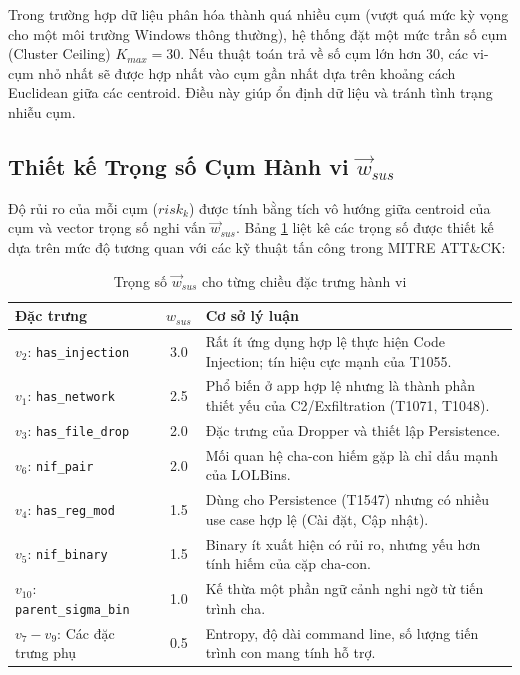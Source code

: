 \documentclass[../main.tex]{subfiles}
\begin{document}
Trong trường hợp dữ liệu phân hóa thành quá nhiều cụm (vượt quá mức kỳ vọng cho một môi trường Windows thông thường), hệ thống đặt một mức trần số cụm (Cluster Ceiling) $K_{max} = 30$. Nếu thuật toán trả về số cụm lớn hơn 30, các vi-cụm nhỏ nhất sẽ được hợp nhất vào cụm gần nhất dựa trên khoảng cách Euclidean giữa các centroid. Điều này giúp ổn định dữ liệu và tránh tình trạng nhiễu cụm.

\subsection{Thiết kế Trọng số Cụm Hành vi $\vec{w}_{sus}$}
\label{subsection:3.6.2}

Độ rủi ro của mỗi cụm ($risk_k$) được tính bằng tích vô hướng giữa centroid của cụm và vector trọng số nghi vấn $\vec{w}_{sus}$. Bảng \ref{tab:w_sus} liệt kê các trọng số được thiết kế dựa trên mức độ tương quan với các kỹ thuật tấn công trong MITRE ATT\&CK:

\begin{table}[h]
\centering
\begin{tabular}{|l|c|p{7cm}|}
\hline
\textbf{Đặc trưng} & \textbf{$w_{sus}$} & \textbf{Cơ sở lý luận} \\ \hline
$v_2$: \texttt{has\_injection} & 3.0 & Rất ít ứng dụng hợp lệ thực hiện Code Injection; tín hiệu cực mạnh của T1055. \\ \hline
$v_1$: \texttt{has\_network} & 2.5 & Phổ biến ở app hợp lệ nhưng là thành phần thiết yếu của C2/Exfiltration (T1071, T1048). \\ \hline
$v_3$: \texttt{has\_file\_drop} & 2.0 & Đặc trưng của Dropper và thiết lập Persistence. \\ \hline
$v_6$: \texttt{nif\_pair} & 2.0 & Mối quan hệ cha-con hiếm gặp là chỉ dấu mạnh của LOLBins. \\ \hline
$v_4$: \texttt{has\_reg\_mod} & 1.5 & Dùng cho Persistence (T1547) nhưng có nhiều use case hợp lệ (Cài đặt, Cập nhật). \\ \hline
$v_5$: \texttt{nif\_binary} & 1.5 & Binary ít xuất hiện có rủi ro, nhưng yếu hơn tính hiếm của cặp cha-con. \\ \hline
$v_{10}$: \texttt{parent\_sigma\_bin} & 1.0 & Kế thừa một phần ngữ cảnh nghi ngờ từ tiến trình cha. \\ \hline
$v_7 - v_9$: Các đặc trưng phụ & 0.5 & Entropy, độ dài command line, số lượng tiến trình con mang tính hỗ trợ. \\ \hline
\end{tabular}
\caption{Trọng số $\vec{w}_{sus}$ cho từng chiều đặc trưng hành vi}
\label{tab:w_sus}
\end{table}
\end{document}
